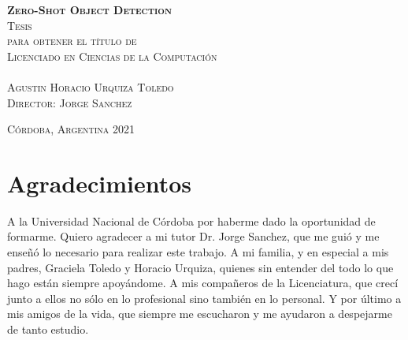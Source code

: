 \documentclass[12pt,twosided]{book}
\begin{document}
\begin{titlepage}
\begin{center}
\vspace{1em}

\textsc{\huge \textbf{Zero-Shot Object Detection}}\\[2em]

\textsc{\large Tesis}\\[1em]

\textsc{ para obtener el título de}\\[1em]

\textsc{Licenciado en Ciencias de la Computación}\\[1em]

\textsc{}\\[1em]

\textsc{\Large Agustin Horacio Urquiza Toledo}\\[1em]

\textsc{\large Director: Jorge Sanchez}

\end{center}

\vspace*{\fill}
\textsc{Córdoba, Argentina \hspace*{\fill} 2021}

\end{titlepage}

\pagestyle{empty}
\frontmatter

\begin{flushright}
\textit{}
\end{flushright}

\chapter*{Agradecimientos}
A la Universidad Nacional de Córdoba por haberme dado la
oportunidad de formarme. Quiero agradecer a mi tutor Dr. Jorge Sanchez, que me guió y me enseñó lo necesario para realizar este trabajo. A mi familia, y en especial a mis padres, Graciela Toledo y Horacio Urquiza, quienes sin entender del todo lo que hago están siempre apoyándome. A mis compañeros de la Licenciatura, que crecí junto a ellos no sólo en lo profesional sino también en lo personal. Y por último a mis amigos de la vida, que siempre me escucharon y me ayudaron a despejarme de tanto estudio.
\end{document}
